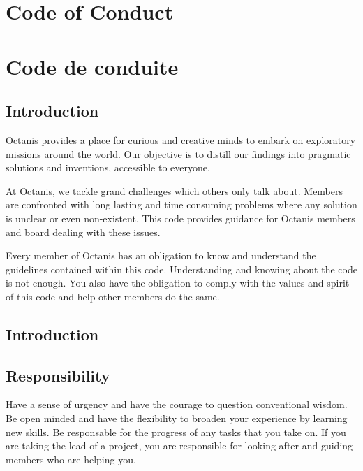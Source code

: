 \renewcommand{\thesubsection}{\arabic{subsection}}

\english
	\section*{Code of Conduct}

\french
	\section*{Code de conduite}



\english
	\subsection{Introduction}
	{\semibold Octanis provides a place for curious and creative minds to embark on exploratory missions around the world. Our objective is to distill our findings into pragmatic solutions and inventions, accessible to everyone. }


	At Octanis, we tackle grand challenges which others only talk about. Members are confronted with long lasting and time consuming problems where any solution is unclear or even non-existent. This code provides guidance for Octanis members and board dealing with these issues.

	Every member of Octanis has an obligation to know and understand the guidelines contained within this code.
	Understanding and knowing about the code is not enough. You also have the obligation to comply with the values and spirit of this code and help other members do the same.

\french
	\subsection{Introduction}




\english
	\subsection{Responsibility}
	Have a sense of urgency and have the courage to question conventional wisdom. Be open minded and have the flexibility to broaden your experience by learning new skills. Be responsable for the progress of any tasks that you take on. If you are taking the lead of a project, you are responsible for looking after and guiding members who are helping you.




